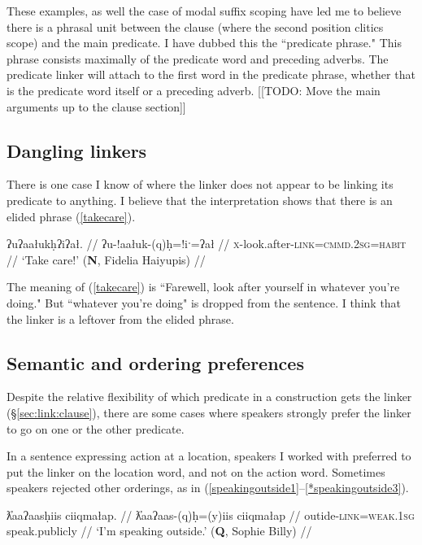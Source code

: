 These examples, as well the case of modal suffix scoping have led me to believe there is a phrasal unit between the clause (where the second position clitics scope) and the main predicate. I have dubbed this the ``predicate phrase." This phrase consists maximally of the predicate word and preceding adverbs. The predicate linker will attach to the first word in the predicate phrase, whether that is the predicate word itself or a preceding adverb. [[TODO: Move the main arguments up to the clause section]]

\subsection{Dangling linkers} \label{sec:link:dangling}

There is one case I know of where the linker does not appear to be linking its predicate to anything. I believe that the interpretation shows that there is an elided phrase (\ref{takecare}).

\ex \label{takecare}
\begingl
\glpreamble ʔuʔaałukḥʔiʔał. //
\gla ʔu-!aałuk-(q)ḥ=!iˑ=ʔał //
\glb \textsc{x}-look.after-\textsc{link}=\textsc{cmmd.2sg}=\textsc{habit} //
\glft `Take care!' (\textbf{N}, Fidelia Haiyupis) //
\endgl
\xe

The meaning of (\ref{takecare}) is ``Farewell, look after yourself in whatever you're doing." But ``whatever you're doing" is dropped from the sentence. I think that the linker is a leftover from the elided phrase. %

\subsection{Semantic and ordering preferences} \label{sec:link:preferences}

Despite the relative flexibility of which predicate in a construction gets the linker (\S\ref{sec:link:clause}), there are some cases where speakers strongly prefer the linker to go on one or the other predicate.

In a sentence expressing action at a location, speakers I worked with preferred to put the linker on the location word, and not on the action word. Sometimes speakers rejected other orderings, as in (\ref{speakingoutside1}--\ref{*speakingoutside3}).

\ex \label{speakingoutside1}
\begingl
\glpreamble ƛ̓aaʔaasḥiis ciiqmałap. //
\gla ƛ̓aaʔaas-(q)ḥ=(y)iis ciiqmałap //
\glb outide-\textsc{link}=\textsc{weak.1sg} speak.publicly //
\glft `I'm speaking outside.' (\textbf{Q}, Sophie Billy) //
\endgl
\xe

